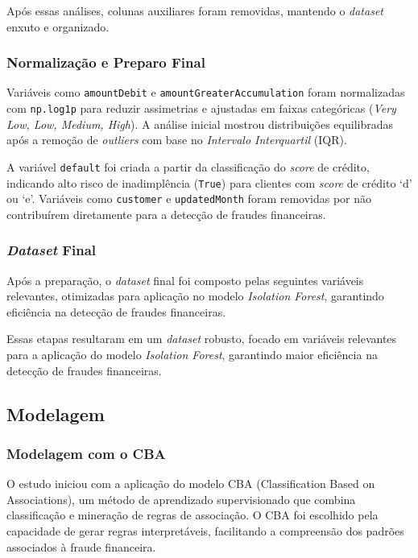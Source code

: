 \documentclass[12pt,a4paper]{article}
\begin{document}
Após essas análises, colunas auxiliares foram removidas, mantendo o \textit{dataset} enxuto e organizado.

\subsubsection{Normalização e Preparo Final}

Variáveis como \texttt{amountDebit} e \texttt{amountGreaterAccumulation} foram normalizadas com \texttt{np.log1p} para reduzir assimetrias e ajustadas em faixas categóricas (\textit{Very Low, Low, Medium, High}). A análise inicial mostrou distribuições equilibradas após a remoção de \textit{outliers} com base no \textit{Intervalo Interquartil} (IQR).

A variável \texttt{default} foi criada a partir da classificação do \textit{score} de crédito, indicando alto risco de inadimplência (\texttt{True}) para clientes com \textit{score} de crédito `d' ou `e'. Variáveis como \texttt{customer} e \texttt{updatedMonth} foram removidas por não contribuírem diretamente para a detecção de fraudes financeiras.

\subsubsection{\textit{Dataset} Final}
Após a preparação, o \textit{dataset} final foi composto pelas seguintes variáveis relevantes, otimizadas para aplicação no modelo \textit{Isolation Forest}, garantindo eficiência na detecção de fraudes financeiras.


Essas etapas resultaram em um \textit{dataset} robusto, focado em variáveis relevantes para a aplicação do modelo \textit{Isolation Forest}, garantindo maior eficiência na detecção de fraudes financeiras.


\subsection{Modelagem}
\subsubsection{Modelagem com o CBA}
O estudo iniciou com a aplica\c{c}\~{a}o do modelo CBA (Classification Based on Associations), um m\'etodo de aprendizado supervisionado que combina classifica\c{c}\~{a}o e minera\c{c}\~{a}o de regras de associa\c{c}\~{a}o. O CBA foi escolhido pela capacidade de gerar regras interpret\'aveis, facilitando a compreens\~{a}o dos padr\~{o}es associados \`a fraude financeira.
\end{document}
